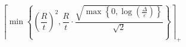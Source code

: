 \[\left\lceil \min\left\{ \left(\frac{R}{t}\right)^{2}, \frac{R}{t} \cdot \frac{\sqrt{\max\left\{ 0, \log\left(\frac{\Delta}{\varepsilon}\right) \right\}}}{\sqrt{2}} \right\} \right\rceil_{+}\]
